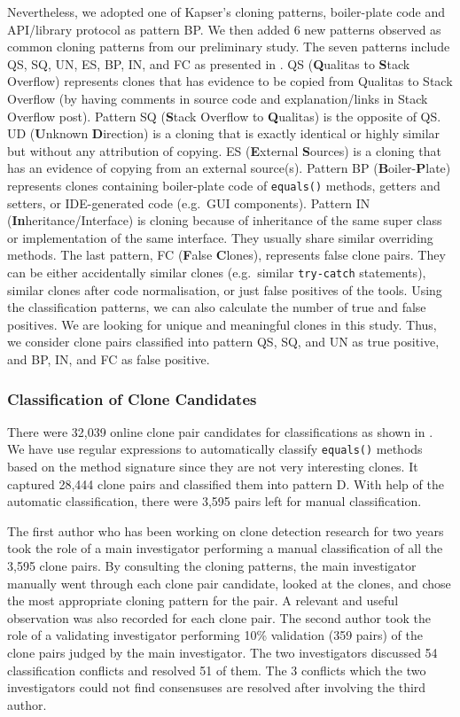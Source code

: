 \documentclass{sig-alternate-05-2015}
\begin{document}
Nevertheless, we adopted one of Kapser's cloning patterns, boiler-plate code and API/library protocol as pattern BP. We then added 6 new patterns observed as common cloning patterns from our preliminary study. The seven patterns include QS, SQ, UN, ES, BP, IN, and FC as presented in . QS (\textbf{Q}ualitas to \textbf{S}tack Overflow) represents clones that has evidence to be copied from Qualitas to Stack Overflow (by having comments in source code and explanation/links in Stack Overflow post). Pattern SQ (\textbf{S}tack Overflow to \textbf{Q}ualitas) is the opposite of QS. UD (\textbf{U}nknown \textbf{D}irection) is a cloning that is exactly identical or highly similar but without any attribution of copying. ES (\textbf{E}xternal \textbf{S}ources) is a cloning that has an evidence of copying from an external source(s). Pattern BP (\textbf{B}oiler-\textbf{P}late) represents clones containing boiler-plate code of \verb|equals()| methods, getters and setters, or IDE-generated code (e.g.~GUI components). Pattern IN (\textbf{In}heritance/Interface) is cloning because of inheritance of the same super class or implementation of the same interface. They usually share similar overriding methods. The last pattern, FC (\textbf{F}alse \textbf{C}lones), represents false clone pairs. They can be either accidentally similar clones (e.g.~similar \texttt{try-catch} statements), similar clones after code normalisation, or just false positives of the tools. Using the classification patterns, we can also calculate the number of true and false positives. We are looking for unique and meaningful clones in this study. Thus, we consider clone pairs classified into pattern QS, SQ, and UN as true positive, and BP, IN, and FC as false positive.

\subsubsection{Classification of Clone Candidates}

There were 32,039 online clone pair candidates for classifications as shown in . We have use regular expressions to automatically classify \texttt{equals()} methods based on the method signature since they are not very interesting clones. It captured 28,444 clone pairs and classified them into pattern D. With help of the automatic classification, there were 3,595 pairs left for manual classification.

The first author who has been working on clone detection research for two years took the role of a main investigator performing a manual classification of all the 3,595 clone pairs. By consulting the cloning patterns, the main investigator manually went through each clone pair candidate, looked at the clones, and chose the most appropriate cloning pattern for the pair. A relevant and useful observation was also recorded for each clone pair. The second author took the role of a validating investigator performing 10\% validation (359 pairs) of the clone pairs judged by the main investigator. The two investigators discussed 54 classification conflicts and resolved 51 of them. The 3 conflicts which the two investigators could not find consensuses are resolved after involving the third author. 
\end{document}
